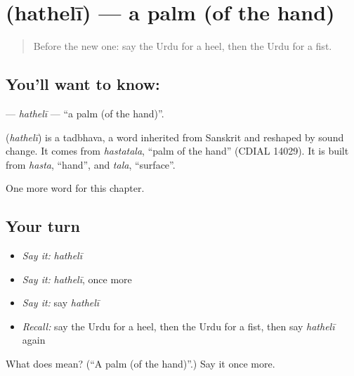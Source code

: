 \section[\texorpdfstring{\ur{ہتھیلی} (hathelī)}{ہتھیلی (hathelī)}]{ (hathelī) — a palm (of the hand)}

\label{lesson:UR-C186-hatheli}



\begin{quote}
Before the new one: say the Urdu for a heel, then the Urdu for a fist.
\end{quote}

\subsection*{You'll want to know: }
\textbf{} — \emph{hathelī} — \textquotedblleft{}a palm (of the hand)\textquotedblright{}.

\begin{cousinweb}
\textbf{} (\emph{hathelī}) is a tadbhava, a word inherited from Sanskrit and reshaped by sound change. It comes from \emph{hastatala}, \textquotedblleft{}palm of the hand\textquotedblright{} (CDIAL 14029). It is built from \emph{hasta}, \textquotedblleft{}hand\textquotedblright{}, and \emph{tala}, \textquotedblleft{}surface\textquotedblright{}.
\end{cousinweb}

\begin{grammarlens}[title={What you've built}]
One more word for this chapter.
\end{grammarlens}

\subsection*{Your turn}
\begin{itemize}
\raggedright
  \item \emph{Say it:} \emph{hathelī}
  \item \emph{Say it:} \emph{hathelī}, once more
  \item \emph{Say it:} say \emph{hathelī}
  \item \emph{Recall:} say the Urdu for a heel, then the Urdu for a fist, then say \emph{hathelī} again
\end{itemize}

\begin{tcolorbox}[breakable,colback=teal!4,colframe=teal!35!black,title={Before you move on}]
What does  mean? (\textquotedblleft{}A palm (of the hand)\textquotedblright{}.) Say it once more.
\end{tcolorbox}
